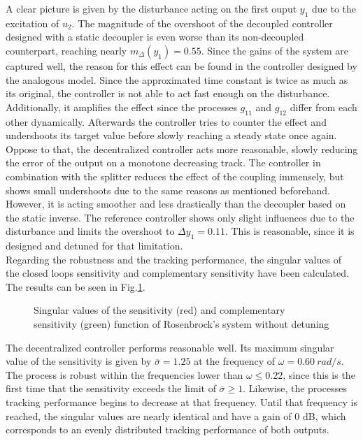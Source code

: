 A clear picture is given by the disturbance acting on the first ouput $y_1$ due to the excitation of $u_2$. The magnitude of the overshoot of the decoupled controller designed with a static decoupler is even worse than its non-decoupled counterpart, reaching nearly $m_{\Delta}(y_1) = 0.55$. Since the gains of the system are captured well, the reason for this effect can be found in the controller designed by the analogous model. Since the approximated time constant is twice as much as its original, the controller is not able to act fast enough on the disturbance. Additionally, it amplifies the effect since the processes $g_{11}$ and $g_{12}$ differ from each other dynamically. Afterwards the controller tries to counter the effect and undershoots its target value before slowly reaching a steady state once again.\\

Oppose to that, the decentralized controller acts more reasonable, slowly reducing the error of the output on a monotone decreasing track. The controller in combination with the splitter reduces the effect of the coupling immensely, but shows small undershoots due to the same reasons as mentioned beforehand. However, it is acting smoother and less drastically than the decoupler based on the static inverse. The reference controller shows only slight influences due to the disturbance and limits the overshoot to $\Delta y_1 = 0.11$. This is reasonable, since it is designed and detuned for that limitation.\\

Regarding the robustness and the tracking performance, the singular values of the closed loops sensitivity and complementary sensitivity have been calculated. The results can be seen in Fig.\ref{c:fotd:s:rosenbrock:f:SingVal}.\\

\begin{figure}[H]\centering

\caption{Singular values of the sensitivity (red) and complementary sensitivity (green) function of Rosenbrock's system without detuning}
\label{c:fotd:s:rosenbrock:f:SingVal}
\end{figure}


The decentralized controller performs reasonable well. Its maximum singular value of the sensitivity is given by $\overline{\sigma} = 1.25$ at the frequency of $\omega = 0.60 ~rad/s$. The process is robust within the frequencies lower than $\omega \leq 0.22$, since this is the first time that the sensitivity exceeds the limit of $\overline{\sigma} \geq 1$. Likewise, the processes tracking performance begins to decrease at that frequency. Until that frequency is reached, the singular values are nearly identical and have a gain of 0 dB, which corresponds to an evenly distributed tracking performance of both outputs. \\

